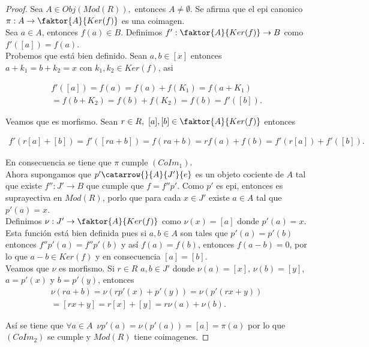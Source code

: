 \documentclass{article}
\begin{document}
\begin{enumerate}[label=\textbf{Ej \arabic*.}]
\begin{proof}
Sea $A\in Obj(Mod(R)),$ entonces  $A\neq \emptyset$. Se afirma que el epi canonico $\pi:A\to \faktor{A}{Ker(f)}$ es una coimagen.\\

Sea $a\in A$, entonces $f(a)\in B$. Definimos $f': \faktor{A}{Ker(f)}\to B$ como $f'([a])=f(a)$.\\

Probemos que está bien definido. Sean $a,b\in [x]$ entonces \\$a+k_1=b+k_2=x$ con $k_1, k_2\in Ker(f)$, asi

\begin{align*}
f'([a])=f(a)=f(a)+f(K_1)=f(a+K_1)\\
=f(b+K_2)=f(b)+f(K_2)=f(b)=f'([b]).
\end{align*}

Veamos que es morfismo. Sean $r\in R,\,\,[a],[b]\in  \faktor{A}{Ker(f)}$ entonces 

\begin{align*}
f'(r[a]+[b])=f'([ra+b])=f(ra+b)=rf(a)+f(b)=f'(r[a])+f'([b]).
\end{align*}

En consecuencia se tiene que $\pi$ cumple $(CoIm_1)$.\\

Ahora supongamos que $p'\catarrow{}{A}{J'}{e}$ es un objeto cociente de $A$ tal que existe $f'':J'\to B$ que cumple que $f=f''p'$. Como $p'$ es
epi, entonces es suprayectiva en $Mod(R)$, porlo que para cada $x\in J'$ existe $a\in A$ tal que $p'(a)=x$.\\

Definimos $\nu:J'\to \faktor{A}{Ker(f)}$ como $\nu(x)=[a]$ donde $p'(a)=x$. Esta función está bien definida pues si $a,b\in A$ son tales que 
$p'(a)=p'(b)$ entonces $f''p'(a)=f''p'(b)$ y así $f(a)=f(b)$, entonces $f(a-b)=0$, por lo que $a-b\in Ker(f)$ y en consecuencia $[a]=[b]$.\\

Veamos que $\nu$ es morfismo. Si $r\in R\,\,a,b\in J'$ donde $\nu(a)=[x]$, $\nu(b)=[y]$, $a=p'(x)$ y $b=p'(y)$, entonces 
\begin{gather*}
\nu(ra+b)=\nu(rp'(x)+p'(y))=\nu(p'(rx+y))\\
=[rx+y]=r[x]+[y]=r\nu(a)+\nu(b).
\end{gather*}

Así se tiene que $\forall a\in A\,\,\,\nu p'(a)=\nu(p'(a))=[a]=\pi(a)$ por lo que $(CoIm_2)$ se cumple y $Mod(R)$ tiene coimagenes.


\end{proof}
\end{enumerate}
\end{document}
